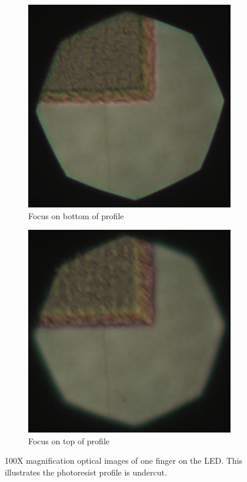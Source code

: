 \begin{figure}
    \centering
    \begin{subfigure}{0.49\linewidth}
        \centering
        \includegraphics[width=\textwidth]{figures/led_bottom_100x.png}
        \caption{Focus on bottom of profile}
        \label{fig:undercut_bot}
    \end{subfigure}
    \hfill
    \begin{subfigure}{0.49\linewidth}
        \centering
        \includegraphics[width=\textwidth]{figures/led_top_100x.png}
        \caption{Focus on top of profile}
        \label{fig:undercut_top}
    \end{subfigure}
    \caption{100X magnification optical images of one finger on the LED. 
    This illustrates the photoresist profile is undercut.}
\end{figure}


